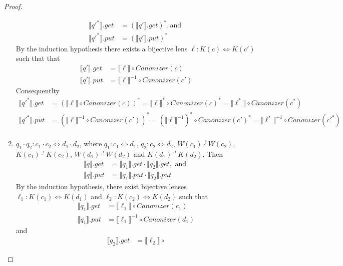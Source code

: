 \documentclass{svproc}
\newcommand{\canonizer}{\ensuremath{\mathit{Canonizer}}}
\begin{document}
\begin{proof}
\begin{enumerate}
  \begin{align*}
  \llbracket {q'}^* \rrbracket.get &= (\llbracket q' \rrbracket.get)^*, \text{
  and }\\
  \llbracket {q'}^* \rrbracket.put &= (\llbracket q' \rrbracket.put)^*
  \end{align*}
  By the induction hypothesis there exists a bijective lens $\ell : K(c)
  \Leftrightarrow K(c')$ such that 
   that
  \begin{align*}
\llbracket q' \rrbracket.get &= \llbracket \ell \rrbracket \circ
\canonizer(c)\\
\llbracket q' \rrbracket.put &= {\llbracket \ell \rrbracket}^{-1} \circ
\canonizer(c')
\end{align*}
Consequentlty
\begin{align*}
\llbracket {q'}^* \rrbracket.get &= (\llbracket \ell \rrbracket \circ
\canonizer(c))^* = \llbracket \ell \rrbracket^* \circ
\canonizer(c)^* = \llbracket \ell^* \rrbracket \circ
\canonizer(c^*)\\
\llbracket {q'}^* \rrbracket.put &= (\llbracket \ell \rrbracket^{-1} \circ
\canonizer(c'))^* = (\llbracket \ell \rrbracket^{-1})^* \circ
\canonizer(c')^* = \llbracket \ell^* \rrbracket^{-1} \circ
\canonizer(c'^*)\\
\end{align*}
\item
  $q_1 \cdot q_2: c_1 \cdot c_2 \Leftrightarrow d_1 \cdot d_2$, where $q_1 : c_1
  \Leftrightarrow d_1 $,  $q_2 : c_2 \Leftrightarrow d_2$, $W(c_1)
  \cdot^! W(c_2)$, $K(c_1) \cdot^! K(c_2)$, $W(d_1) \cdot^! W(d_2)$ and $
  K(d_1) \cdot^! K(d_2)$. Then
  \begin{align*}
  \llbracket q \rrbracket.get &= \llbracket q_1 \rrbracket.get \cdot \llbracket
  q_2 \rrbracket.get, \text{ and }\\
  \llbracket q \rrbracket.put &= \llbracket q_1 \rrbracket.put \cdot \llbracket
  q_2 \rrbracket.put
  \end{align*}
By the induction hypothesis, there exist bijective lenses $\ell_1 : K(c_1)
\Leftrightarrow K(d_1)$ and $\ell_2 : K(c_2) \Leftrightarrow K(d_2)$ such that
\begin{align*}
\llbracket q_1 \rrbracket.get &= \llbracket \ell_1 \rrbracket \circ
\canonizer(c_1)\\
\llbracket q_1 \rrbracket.put &= {\llbracket \ell_1 \rrbracket}^{-1} \circ
\canonizer(d_1)
\end{align*}
and
\begin{align*}
\llbracket q_2 \rrbracket.get &= \llbracket \ell_2 \rrbracket \circ

\end{align*}
\end{enumerate}
\end{proof}
\end{document}
